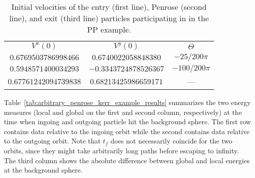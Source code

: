 \begin{table}[]
  \centering
  \begin{tabular}{ccc}
    \hline\hline
    $V^x(0)$              & $V^y(0)$              & $\Theta$       \\
    $0.6769503786998466$  & $0.6740022058848380$  & $-25/200 \pi$  \\
    $0.5948571400034293$  & $-0.3343724878526367$ & $-100/200 \pi$ \\
    $0.67761242094739838$ & $0.68213425986659171$ & ---            \\ \hline\hline
  \end{tabular}
  \caption{Initial velocities of the entry (first line), Penrose (second line), and exit (third line) particles participating in in the \ac{PP} example.}
  \label{tab:arbitrary_penrose_kerr_example_velocities}
\end{table}

Table~\ref{tab:arbitrary_penrose_kerr_example_results} summarizes the two energy measures (local and global on the first and second column, respectively) at the time when ingoing and outgoing particle hit the background sphere. The first row contains data relative to the ingoing orbit while the second contains data relative to the outgoing orbit. Note that $t_f$ does not necessarily coincide for the two orbits, since they might take arbitrarily long paths before escaping to infinity. The third column shows the absolute difference between global and local energies at the background sphere.

\begin{table}[]
  \centering
  \caption{Energy measures at the time of collision with the background sphere for the entry (first line), Penrose (second line), and exit (third line) particles. Note that $t_f$ is not necessarily the same for both trajectories.}
  \label{tab:arbitrary_penrose_kerr_example_results}
\end{table}


